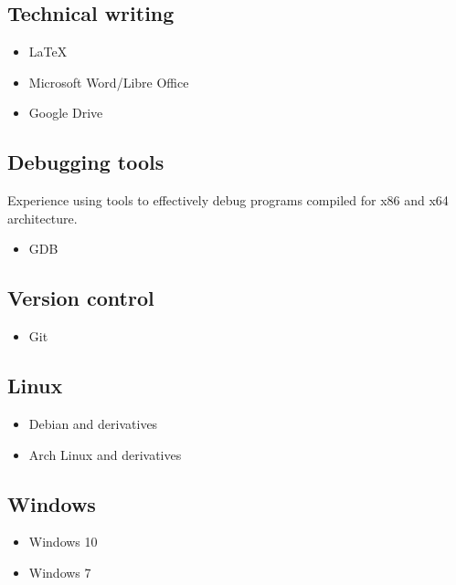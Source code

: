 \documentclass[letterpaper]{article}
\begin{document}
        \subsection*{Technical writing}

        \begin{itemize}
            \item LaTeX
            \item Microsoft Word/Libre Office
            \item Google Drive
        \end{itemize}

        \subsection*{Debugging tools}
        Experience using tools to effectively debug programs compiled for x86 and x64 architecture.

        \begin{itemize}
            \item GDB
        \end{itemize}

        \subsection*{Version control}

        \begin{itemize}
            \item Git
        \end{itemize}

        \subsection*{Linux}

        \begin{itemize}
            \item Debian and derivatives
            \item Arch Linux and derivatives
        \end{itemize}

        \subsection*{Windows}

        \begin{itemize}
            \item Windows 10
            \item Windows 7
        \end{itemize}
\end{document}
